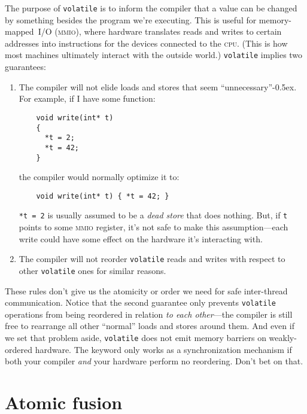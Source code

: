 \documentclass[fontsize=\bodyfontsize, numbers=endperiod]{scrartcl}
\newcommand{\codesize}{\fontsize{\bodyfontsize}{\bodybaselineskip}}
\newcommand{\quotekern}{\kern-0.5ex}
\newcommand{\monobox}[1]{\mbox{\texttt{#1}}}
\newcommand{\keyword}[1]{\monobox{\color{darkGreen}#1}}
\newcommand{\introduce}[1]{\textit{#1}}
\newenvironment{colfigure}
  {\par\vspace{1\baselineskip minus 0.5\baselineskip}\noindent\minipage{\linewidth}}
  {\endminipage\vspace{1\baselineskip minus 0.7\baselineskip}}
\begin{document}
\begin{multicols}{2}
The purpose of \keyword{volatile} is to inform the compiler that a value can
be changed by something besides the program we're executing.
This is useful for memory-mapped~\textsc{I/O} \textsc{(mmio)},
where hardware translates reads and writes to certain addresses
into instructions for the devices connected to the \textsc{cpu}.
(This is how most machines ultimately interact with the outside world.)
\keyword{volatile} implies two guarantees:
\begin{enumerate}
\item The compiler will not elide loads and stores that seem
    ``unnecessary''\quotekern.
    For example, if I have some function:
    \begin{colfigure}
    \begin{verbatim}
    void write(int* t)
    {
      *t = 2;
      *t = 42;
    }
    \end{verbatim}
    \end{colfigure}
    the compiler would normally optimize it to:
    \begin{verbatim}
    void write(int* t) { *t = 42; }
    \end{verbatim}
    \texttt{*t = 2} is usually assumed to be a
    \introduce{dead store} that does nothing.
    But, if \texttt{t} points to some \textsc{mmio} register, it's not
    safe to make this assumption---each write could have some effect
    on the hardware it's interacting with.

\item The compiler will not reorder \keyword{volatile}
    reads and writes with respect to other \keyword{volatile} ones
    for similar reasons.
\end{enumerate}

These rules don't give us the atomicity or order we need for safe
inter-thread communication.
Notice that the second guarantee only prevents \keyword{volatile} operations
from being reordered in relation \emph{to each other}---the compiler is still
free to rearrange all other ``normal'' loads and stores around them.
And even if we set that problem aside,
\keyword{volatile} does not emit memory barriers on weakly-ordered hardware.
The keyword only works as a synchronization mechanism if both your compiler
\emph{and} your hardware perform no reordering.
Don't bet on that.

\section{Atomic fusion}
\label{fusing}


\end{multicols}
\end{document}
